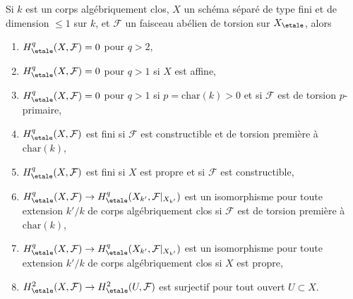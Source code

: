 \begin{theorem}
\label{theorem-vanishing-affine-curves}
Si $k$ est un corps algébriquement clos, $X$ un schéma séparé de type fini
et de dimension $\leq 1$ sur $k$, et $\mathcal{F}$ un faisceau abélien
de torsion sur $X_\etale$, alors
\begin{enumerate}
\item
$H^q_\etale(X, \mathcal{F}) = 0$ pour $q > 2$,
\item
$H^q_\etale(X, \mathcal{F}) = 0$ pour $q > 1$ si $X$ est affine,
\item
$H^q_\etale(X, \mathcal{F}) = 0$ pour $q > 1$ si $p = \text{char}(k) > 0$
et si $\mathcal{F}$ est de torsion $p$-primaire,
\item
$H^q_\etale(X, \mathcal{F})$ est fini si $\mathcal{F}$ est constructible
et de torsion première à $\text{char}(k)$,
\item
$H^q_\etale(X, \mathcal{F})$ est fini si $X$ est propre et si
$\mathcal{F}$ est constructible,
\item
$H^q_\etale(X, \mathcal{F}) \to
H^q_\etale(X_{k'}, \mathcal{F}|_{X_{k'}})$ est un isomorphisme
pour toute extension $k'/k$ de corps algébriquement clos
si $\mathcal{F}$ est de torsion première à $\text{char}(k)$,
\item
$H^q_\etale(X, \mathcal{F}) \to
H^q_\etale(X_{k'}, \mathcal{F}|_{X_{k'}})$ est un isomorphisme
pour toute extension $k'/k$ de corps algébriquement clos
si $X$ est propre,
\item
$H^2_\etale(X, \mathcal{F}) \to H^2_\etale(U, \mathcal{F})$
est surjectif pour tout ouvert $U \subset X$.
\end{enumerate}
\end{theorem}


